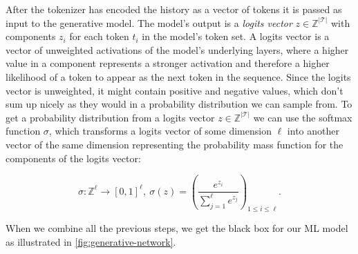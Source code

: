 After the tokenizer has encoded the history as a vector of tokens it is passed as input to the generative model.
The model's output is a \emph{logits vector} $z \in \mathbb{Z}^{|\mathcal{T}|}$ with components $z_i$ for each token $t_i$ in the model's token set.
A logits vector is a vector of unweighted activations of the model's underlying layers, where a higher value in a component represents a stronger activation and therefore a higher likelihood of a token to appear as the next token in the sequence.
Since the logits vector is unweighted, it might contain positive and negative values, which don't sum up nicely as they would in a probability distribution we can sample from.
To get a probability distribution from a logits vector $z \in \mathbb{Z}^{|\mathcal{T}|}$ we can use the softmax function $\sigma$, which transforms a logits vector of some dimension $\ell$ into another vector of the same dimension representing the probability mass function for the components of the logits vector:

$$\sigma \colon \mathbb{Z}^{\ell} \rightarrow [0,1]^{\ell},~ \sigma(z) = \left(\frac{e^{z_i}}{\sum_{j=1}^{\ell} e^{z_j}}\right)_{1 \leq i \leq \ell}.$$

When we combine all the previous steps, we get the black box for our ML model as illustrated in \autoref{fig:generative-network}.

